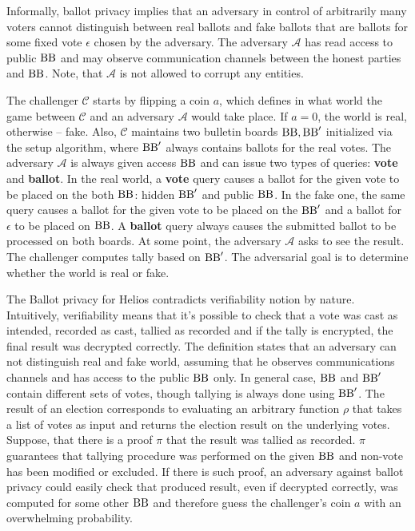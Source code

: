 Informally, ballot privacy implies that an adversary in control of arbitrarily many voters cannot distinguish between real ballots and fake ballots that are ballots for some fixed vote $\epsilon$ chosen by the adversary. The adversary $\mathcal{A}$ has read access to public $\operatorname{BB}$ and may observe communication channels between the honest parties and $\operatorname{BB}$. Note, that $\mathcal{A}$  is not allowed to corrupt any entities. \\

\theoremstyle{definition}
\begin{definition}
The challenger $\mathcal{C}$ starts by flipping a coin $a$, which defines in what world the game between $\mathcal{C}$ and an adversary  $\mathcal{A}$ would take place.  If $a=0$, the world is real, otherwise -- fake. Also, $\mathcal{C}$  maintains two bulletin boards $\operatorname{BB},\operatorname{BB}'$ initialized via the setup algorithm, where $\operatorname{BB}'$ always contains ballots for the real votes.  The adversary $\mathcal{A}$ is always given access $\operatorname{BB}$ and can issue two types of queries: \textbf{vote} and \textbf{ballot}.  In the real world, a \textbf{vote} query causes a ballot for the given vote to be placed on the both $\operatorname{BB}$: hidden $\operatorname{BB}'$ and public $\operatorname{BB}$. In the fake one, the same query causes a ballot for the given vote to be placed on the $\operatorname{BB}'$ and a ballot for $\epsilon$  to be placed on $\operatorname{BB}$. A \textbf{ballot} query always causes the submitted ballot to be processed on both boards. At some point, the adversary $\mathcal{A}$ asks to see the result. The challenger computes tally based on $\operatorname{BB}'$. The adversarial goal is to determine whether the world is real or fake.\\
\end{definition}

The Ballot privacy for Helios contradicts verifiability notion by nature. Intuitively, verifiability means that it's possible to check that a vote was cast as intended, recorded as cast, tallied as recorded and if the tally is encrypted, the final result was decrypted correctly. The definition states that an adversary can not distinguish real and fake world, assuming that he observes communications channels and has access to the public $\operatorname{BB}$ only. In general case, $\operatorname{BB}$ and $\operatorname{BB}'$ contain different sets of votes, though tallying is always done using $\operatorname{BB}'$. The result of an election corresponds to evaluating an arbitrary function $\rho$ that takes a list of votes as input and returns the election result on the underlying votes. Suppose, that there is a proof $\pi$ that the result was tallied as recorded. $\pi$ guarantees that tallying procedure was performed on the given $\operatorname{BB}$ and non-vote has been modified or excluded. If there is such proof, an adversary against ballot privacy could easily check that produced result, even if decrypted correctly, was computed for some other $\operatorname{BB}$ and therefore guess the challenger's coin $a$ with an overwhelming probability. \\

